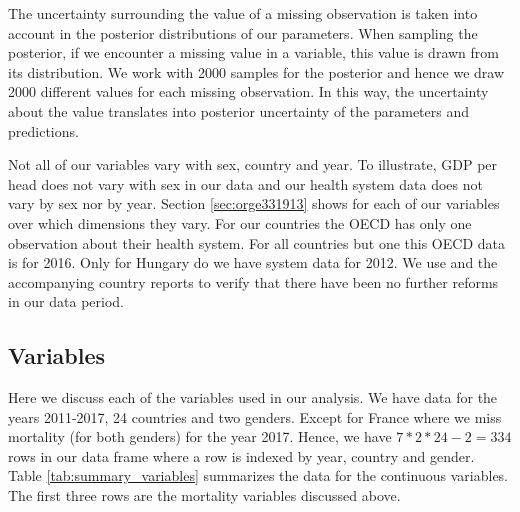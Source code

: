 \documentclass[a4paper,12pt]{article}
\begin{document}
The uncertainty surrounding the value of a missing observation is taken into account in the posterior distributions of our parameters. When sampling the posterior, if we encounter a missing value in a variable, this value is drawn from its distribution. We work with 2000 samples for the posterior and hence we draw 2000 different values for each missing observation. In this way, the uncertainty about the value translates into posterior uncertainty of the parameters and predictions.

Not all of our variables vary with sex, country and year. To illustrate, GDP per head does not vary with sex in our data and our health system data does not vary by sex nor by year. Section \ref{sec:orge331913} shows for each of our variables over which dimensions they vary. For our countries the OECD has only one observation about their health system. For all countries but one this OECD data is for 2016. Only for Hungary do we have system data for 2012. We use \cite{countryprofileReport} and the accompanying country reports to verify that there have been no further reforms in our data period.


\subsection{Variables}
\label{sec:org7e24eca}

Here we discuss each of the variables used in our analysis. We have data for the years 2011-2017, 24 countries and two genders. Except for France where we miss mortality (for both genders) for the year 2017. Hence, we have \(7*2*24-2=334\) rows in our data frame where a row is indexed by year, country and gender. Table \ref{tab:summary_variables} summarizes the data for the continuous variables. The first three rows are the mortality variables discussed above.
\end{document}
